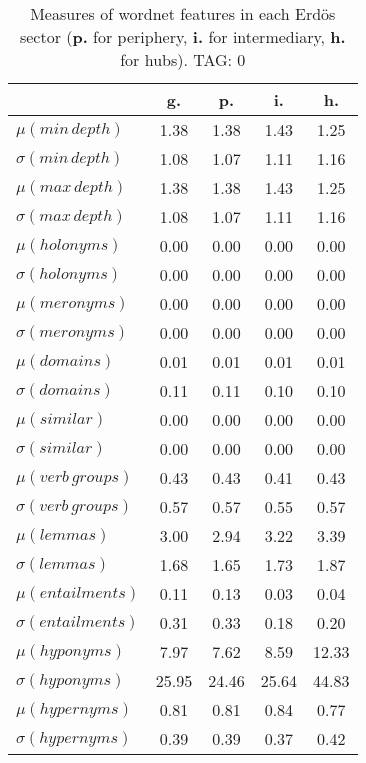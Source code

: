 \begin{table}[h!]
\begin{center}
\begin{tabular}{| l | c | c | c | c |}\hline
 & g. & p. & i. & h. \\\hline
$\mu(min\,depth)$ & 1.38  & 1.38  & 1.43  & 1.25 \\\hline
$\sigma(min\,depth)$ & 1.08  & 1.07  & 1.11  & 1.16 \\\hline
$\mu(max\,depth)$ & 1.38  & 1.38  & 1.43  & 1.25 \\\hline
$\sigma(max\,depth)$ & 1.08  & 1.07  & 1.11  & 1.16 \\\hline
$\mu(holonyms)$ & 0.00  & 0.00  & 0.00  & 0.00 \\\hline
$\sigma(holonyms)$ & 0.00  & 0.00  & 0.00  & 0.00 \\\hline
$\mu(meronyms)$ & 0.00  & 0.00  & 0.00  & 0.00 \\\hline
$\sigma(meronyms)$ & 0.00  & 0.00  & 0.00  & 0.00 \\\hline
$\mu(domains)$ & 0.01  & 0.01  & 0.01  & 0.01 \\\hline
$\sigma(domains)$ & 0.11  & 0.11  & 0.10  & 0.10 \\\hline
$\mu(similar)$ & 0.00  & 0.00  & 0.00  & 0.00 \\\hline
$\sigma(similar)$ & 0.00  & 0.00  & 0.00  & 0.00 \\\hline
$\mu(verb\,groups)$ & 0.43  & 0.43  & 0.41  & 0.43 \\\hline
$\sigma(verb\,groups)$ & 0.57  & 0.57  & 0.55  & 0.57 \\\hline
$\mu(lemmas)$ & 3.00  & 2.94  & 3.22  & 3.39 \\\hline
$\sigma(lemmas)$ & 1.68  & 1.65  & 1.73  & 1.87 \\\hline
$\mu(entailments)$ & 0.11  & 0.13  & 0.03  & 0.04 \\\hline
$\sigma(entailments)$ & 0.31  & 0.33  & 0.18  & 0.20 \\\hline
$\mu(hyponyms)$ & 7.97  & 7.62  & 8.59  & 12.33 \\\hline
$\sigma(hyponyms)$ & 25.95  & 24.46  & 25.64  & 44.83 \\\hline
$\mu(hypernyms)$ & 0.81  & 0.81  & 0.84  & 0.77 \\\hline
$\sigma(hypernyms)$ & 0.39  & 0.39  & 0.37  & 0.42 \\\hline
\end{tabular}
\caption{Measures of wordnet features in each Erd\"os sector ({{\bf p.}} for periphery, {{\bf i.}} for intermediary, {{\bf h.}} for hubs). TAG: 0}
\end{center}
\end{table}